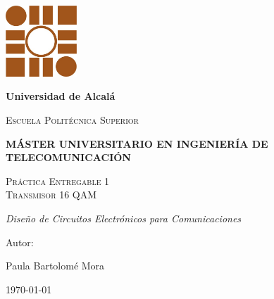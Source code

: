 \begin{titlepage}
\centering
{\includegraphics[width=0.2\textwidth]{./img/logo}\par}
\vspace{0.5cm}
{\bfseries\LARGE Universidad de Alcalá  \par}
\vspace{0.4cm}
{\scshape\Large Escuela Politécnica Superior \par}
\vspace{1.2cm}
{\bfseries\Large MÁSTER UNIVERSITARIO EN INGENIERÍA DE TELECOMUNICACIÓN  \par}
\vspace{2.1cm}
{\scshape\Huge Práctica Entregable 1 \\ Transmisor 16 QAM\par}
\vspace{1.5cm}
{\itshape\Large Diseño de Circuitos Electrónicos para Comunicaciones \par}
\vfill
{\Large Autor: \par}
{\Large Paula Bartolomé Mora \par}
\vfill
{\Large \today \par}
\end{titlepage}